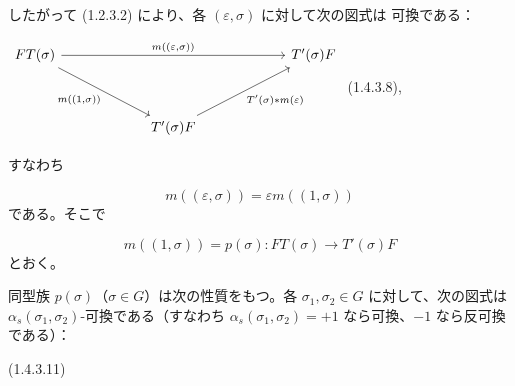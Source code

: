 \clearpage
{}%
したがって (1.2.3.2) により、各 $(\varepsilon,\sigma)$ に対して次の図式は
可換である：

\begin{center}
  $\begin{tikzcd}[ampersand replacement=\&,column sep=6em,row sep=3.5em]
    FT(\sigma)
      \arrow[rr,"{m((\varepsilon,\sigma))}"]
      \arrow[dr,"{m((1,\sigma))}"']
      \& \& T'(\sigma)F \\
      \& T'(\sigma)F
        \arrow[ur,"{T'(\sigma)*m(\varepsilon)}"'] \&
  \end{tikzcd}$
  \hfill\textup{(1.4.3.8)},
\end{center}

\noindent すなわち

\begin{equation}
  m((\varepsilon,\sigma))=\varepsilon m((1,\sigma))
  \tag{1.4.3.9}
\end{equation}
である。そこで

\begin{equation}
  m((1,\sigma))=p(\sigma)\colon
  FT(\sigma)\longrightarrow T'(\sigma)F
  \tag{1.4.3.10}
\end{equation}
とおく。

同型族 $p(\sigma)$（$\sigma\in G$）は次の性質をもつ。各
$\sigma_1,\sigma_2\in G$ に対して、次の図式は
$\alpha_s(\sigma_1,\sigma_2)$-可換である（すなわち
$\alpha_s(\sigma_1,\sigma_2)=+1$ なら可換、$-1$ なら反可換である）：

\begin{center}
  \hfill\textup{(1.4.3.11)}
\end{center}

